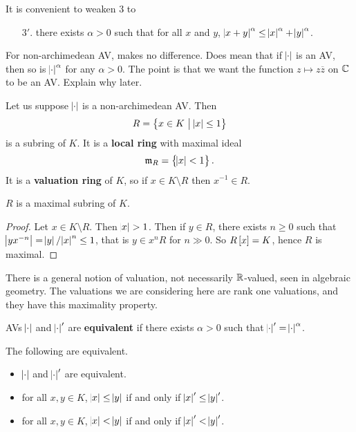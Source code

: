 \begin{remark*}
It is convenient to weaken $ 3 $ to
\begin{itemize}
\item[$ 3' $.] there exists $ \alpha > 0 $ such that for all $ x $ and $ y $, $ \abs{x + y}^\alpha \le \abs{x}^\alpha + \abs{y}^\alpha $.
\end{itemize}
For non-archimedean AV, makes no difference. Does mean that if $ \abs{\cdot} $ is an AV, then so is $ \abs{\cdot}^\alpha $ for any $ \alpha > 0 $. The point is that we want the function $ z \mapsto z\overline{z} $ on $ \mathbb{C} $ to be an AV. Explain why later.
\end{remark*}

Let us suppose $ \abs{\cdot} $ is a non-archimedean AV. Then
$$ R = \cbr{x \in K \st \abs{x} \le 1} $$
is a subring of $ K $. It is a \textbf{local ring} with maximal ideal
$$ \mmm_R = \cbr{\abs{x} < 1}. $$
It is a \textbf{valuation ring} of $ K $, so if $ x \in K \setminus R $ then $ x^{-1} \in R $.

\begin{lemma}
\label{lem:1.1}
$ R $ is a maximal subring of $ K $.
\end{lemma}

\begin{proof}
Let $ x \in K \setminus R $. Then $ \abs{x} > 1 $. Then if $ y \in R $, there exists $ n \ge 0 $ such that $ \abs{yx^{-n}} = \abs{y} / \abs{x}^n \le 1 $, that is $ y \in x^nR $ for $ n \gg 0 $. So $ R\sbr{x} = K $, hence $ R $ is maximal.
\end{proof}

\begin{remark*}
There is a general notion of valuation, not necessarily $ \mathbb{R} $-valued, seen in algebraic geometry. The valuations we are considering here are rank one valuations, and they have this maximality property.
\end{remark*}

AVs $ \abs{\cdot} $ and $ \abs{\cdot}' $ are \textbf{equivalent} if there exists $ \alpha > 0 $ such that $ \abs{\cdot}' = \abs{\cdot}^\alpha $.

\begin{proposition}
\label{prop:1.2}
The following are equivalent.
\begin{itemize}
\item $ \abs{\cdot} $ and $ \abs{\cdot}' $ are equivalent.
\item for all $ x, y \in K $, $ \abs{x} \le \abs{y} $ if and only if $ \abs{x}' \le \abs{y}' $.
\item for all $ x, y \in K $, $ \abs{x} < \abs{y} $ if and only if $ \abs{x}' < \abs{y}' $.
\end{itemize}
\end{proposition}

